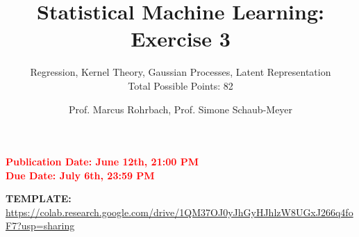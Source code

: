 \documentclass[
	english,
        solution=true
	]{tudaexercise}
\begin{document}
\author{Prof. Marcus Rohrbach, Prof. Simone Schaub-Meyer}
\title[Statistical Machine Learning Exercise 3]{\LARGE Statistical Machine Learning: Exercise 3}
\subtitle{Regression, Kernel Theory, Gaussian Processes, Latent Representation \\ Total Possible Points: 82}
\maketitle

\textcolor{red}{\textbf{Publication Date: June 12th, 21:00 PM}}\\
\textcolor{red}{\textbf{Due Date: July 6th, 23:59 PM}}

\textbf{TEMPLATE:} \href{https://colab.research.google.com/drive/1QM37OJ0yJhGyHJhlzW8UGxJ266q4foF7?usp=sharing}{https://colab.research.google.com/drive/1QM37OJ0yJhGyHJhlzW8UGxJ266q4foF7?usp=sharing}
\end{document}
